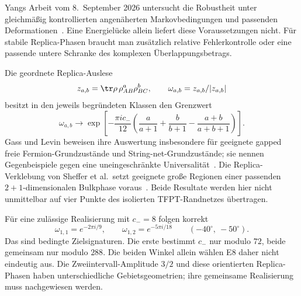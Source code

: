 Yangs Arbeit vom 8.~September 2026 untersucht die Robustheit unter gleichmäßig kontrollierten angenäherten Markovbedingungen und passenden Deformationen~\cite{yangmodular}. Eine Energielücke allein liefert diese Voraussetzungen nicht. Für stabile Replica-Phasen braucht man zusätzlich relative Fehlerkontrolle oder eine passende untere Schranke des komplexen Überlappungsbetrags.

Die geordnete Replica-Auslese
\begin{equation}
z_{a,b}=\tr\rho\,\rho_{AB}^a\rho_{BC}^b,\qquad
\omega_{a,b}=z_{a,b}/|z_{a,b}|
\end{equation}
besitzt in den jeweils begründeten Klassen den Grenzwert
\begin{equation}
\omega_{a,b}\longrightarrow
\exp\!\left[-\frac{\pi i c_-}{12}
\left(\frac a{a+1}+\frac b{b+1}-\frac{a+b}{a+b+1}\right)\right].
\end{equation}
Gass und Levin beweisen ihre Auswertung insbesondere für geeignete gapped freie Fermion-Grundzustände und String-net-Grundzustände; sie nennen Gegenbeispiele gegen eine uneingeschränkte Universalität~\cite{gasslevinreplica}. Die Replica-Verklebung von Sheffer et al.\ setzt geeignete große Regionen einer passenden $2+1$-dimensionalen Bulkphase voraus~\cite{shefferdefects}. Beide Resultate werden hier nicht unmittelbar auf vier Punkte des isolierten TFPT-Randnetzes übertragen.

Für eine zulässige Realisierung mit $c_-=8$ folgen korrekt
\begin{equation}
\boxed{\omega_{1,1}=e^{-2\pi i/9},\qquad
\omega_{1,2}=e^{-5\pi i/18}}
\qquad(-40^\circ,\ -50^\circ).
\end{equation}
Das sind bedingte Zielsignaturen. Die erste bestimmt $c_-$ nur modulo $72$, beide gemeinsam nur modulo $288$. Die beiden Winkel allein wählen E8 daher nicht eindeutig aus. Die Zweiintervall-Amplitude $3/2$ und diese orientierten Replica-Phasen haben unterschiedliche Gebietsgeometrien; ihre gemeinsame Realisierung muss nachgewiesen werden.

